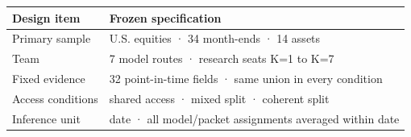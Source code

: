 \footnotesize
\begin{tabular*}{\linewidth}{@{\extracolsep{\fill}}ll}
\toprule
Design item & Frozen specification \\
\midrule\addlinespace[2.5pt]
Primary sample & U.S. equities · 34 month-ends · 14 assets \\
Team & 7 model routes · research seats K=1 to K=7 \\
Fixed evidence & 32 point-in-time fields · same union in every condition \\
Access conditions & shared access · mixed split · coherent split \\
Inference unit & date · all model/packet assignments averaged within date \\
\bottomrule
\end{tabular*}
